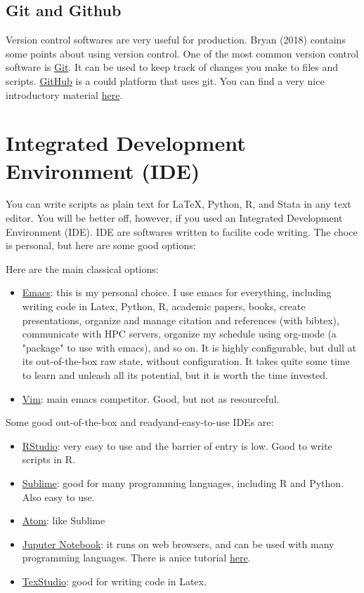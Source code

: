 \documentclass[a4paper]{article}
\begin{document}
\subsection{Git and Github}
\label{sec:org13116e9}
Version control softwares are very useful for production. Bryan (2018) contains some points about using version control. One of the most common version control software is \href{https://git-scm.com/}{Git}. It can be used to keep track of changes you make to files and scripts. \href{https://github.com/}{GitHub} is a could platform that uses git. You can find a very nice introductory material \href{https://www.elegantthemes.com/blog/resources/git-and-github-a-beginners-guide-for-complete-newbies}{here}.


\section{Integrated Development Environment (IDE)}
\label{sec:orgd794cc1}

You can write scripts as plain text for \LaTeX, Python, R, and Stata in any text editor. You will be better off, however, if you used an Integrated Development Environment (IDE). IDE are softwares written to facilite code writing. The choce is personal, but here are some good options:

Here are the main classical options:

\begin{itemize}
\item \href{https://www.gnu.org/software/emacs/}{Emacs}: this is my personal choice. I use emacs for everything, including writing code in Latex, Python, R, academic papers, books, create presentations, organize and manage citation and references (with bibtex), communicate with HPC servers, organize my schedule using org-mode (a "package" to use with emacs), and so on. It is highly configurable, but dull at its out-of-the-box raw state, without configuration. It takes quite some time to learn and unleash all its potential, but it is worth the time invested.
\item \href{https://www.vim.org/}{Vim}: main emacs competitor. Good, but not as resourceful.
\end{itemize}


Some good out-of-the-box and readyand-easy-to-use IDEs are:
\begin{itemize}
\item \href{https://rstudio.com/}{RStudio}: very easy to use and the barrier of entry is low. Good to write scripts in R.
\item \href{https://www.sublimetext.com/}{Sublime}: good for many programming languages, including R and Python. Also easy to use.
\item \href{https://atom.io/}{Atom}: like Sublime
\item \href{https://jupyter.org/}{Juputer Notebook}: it runs on web browsers, and can be used with many programming languages. There is anice tutorial \href{https://www.dataquest.io/blog/jupyter-notebook-tutorial/}{here}.
\item \href{http://texstudio.sourceforge.net/}{TexStudio}: good for writing code in Latex.
\end{itemize}
\end{document}
